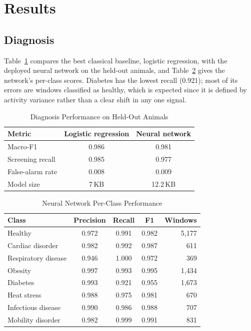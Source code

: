 \documentclass[conference]{IEEEtran}
\begin{document}
\section{Results}

\subsection{Diagnosis}
Table~\ref{tab:diag} compares the best classical baseline, logistic regression,
with the deployed neural network on the held-out animals, and
Table~\ref{tab:perclass} gives the network's per-class scores. Diabetes has the
lowest recall (0.921); most of its errors are windows classified as healthy,
which is expected since it is defined by activity variance rather than a clear
shift in any one signal.

\begin{table}[t]
\caption{Diagnosis Performance on Held-Out Animals}
\label{tab:diag}
\centering
\footnotesize
\begin{tabular}{@{}lcc@{}}
\toprule
\textbf{Metric} & \textbf{Logistic regression} & \textbf{Neural network} \\
\midrule
Macro-F1 & 0.986 & 0.981 \\
Screening recall & 0.985 & 0.977 \\
False-alarm rate & 0.008 & 0.009 \\
Model size & 7\,KB & 12.2\,KB \\
\bottomrule
\end{tabular}
\end{table}

\begin{table}[t]
\caption{Neural Network Per-Class Performance}
\label{tab:perclass}
\centering
\footnotesize
\begin{tabular}{@{}lcccr@{}}
\toprule
\textbf{Class} & \textbf{Precision} & \textbf{Recall} & \textbf{F1} & \textbf{Windows} \\
\midrule
Healthy & 0.972 & 0.991 & 0.982 & 5{,}177 \\
Cardiac disorder & 0.982 & 0.992 & 0.987 & 611 \\
Respiratory disease & 0.946 & 1.000 & 0.972 & 369 \\
Obesity & 0.997 & 0.993 & 0.995 & 1{,}434 \\
Diabetes & 0.993 & 0.921 & 0.955 & 1{,}673 \\
Heat stress & 0.988 & 0.975 & 0.981 & 670 \\
Infectious disease & 0.990 & 0.986 & 0.988 & 707 \\
Mobility disorder & 0.982 & 0.999 & 0.991 & 831 \\
\bottomrule
\end{tabular}
\end{table}
\end{document}
